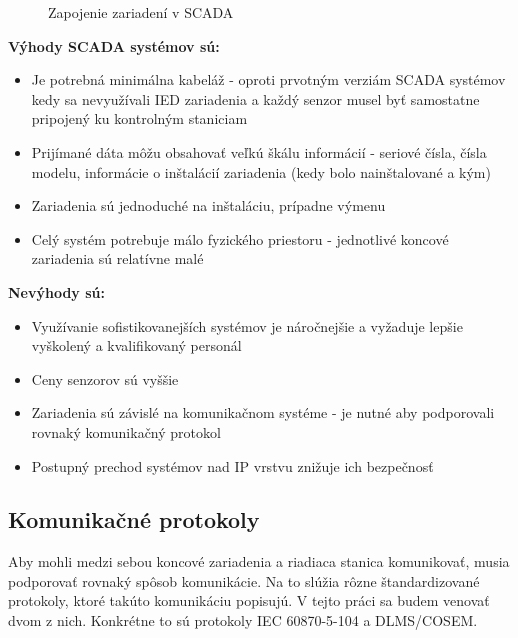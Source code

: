 \begin{figure}[h]
    \centering
    \caption{Zapojenie zariadení v SCADA\cite{SCADA}}
\label{Fieldbus}
\end{figure}

\textbf{Výhody SCADA systémov sú:}
\begin{itemize}
\item Je potrebná minimálna kabeláž - oproti prvotným verziám SCADA systémov kedy sa nevyužívali IED zariadenia a každý senzor musel byť samostatne pripojený ku kontrolným staniciam
\item Prijímané dáta môžu obsahovať veľkú škálu informácií - seriové čísla, čísla modelu, informácie o inštalácií zariadenia (kedy bolo nainštalované a kým)
\item Zariadenia sú jednoduché na inštaláciu, prípadne výmenu
\item Celý systém potrebuje málo fyzického priestoru - jednotlivé koncové zariadenia sú relatívne malé
\end{itemize}
\textbf{Nevýhody sú:}
\begin{itemize}
\item Využívanie sofistikovanejších systémov je náročnejšie a vyžaduje lepšie vyškolený a kvalifikovaný personál
\item Ceny senzorov sú vyššie
\item Zariadenia sú závislé na komunikačnom systéme - je nutné aby podporovali rovnaký komunikačný protokol
\item Postupný prechod systémov nad IP vrstvu znižuje ich bezpečnosť\cite{SCADA}
\end{itemize}
\subsection{Komunikačné protokoly}
\tab Aby mohli medzi sebou koncové zariadenia a riadiaca stanica komunikovať, musia podporovať rovnaký spôsob komunikácie. Na to slúžia rôzne štandardizované protokoly, ktoré takúto komunikáciu popisujú. V tejto práci sa budem venovať dvom z nich. Konkrétne to sú protokoly IEC 60870-5-104 a DLMS/COSEM.
